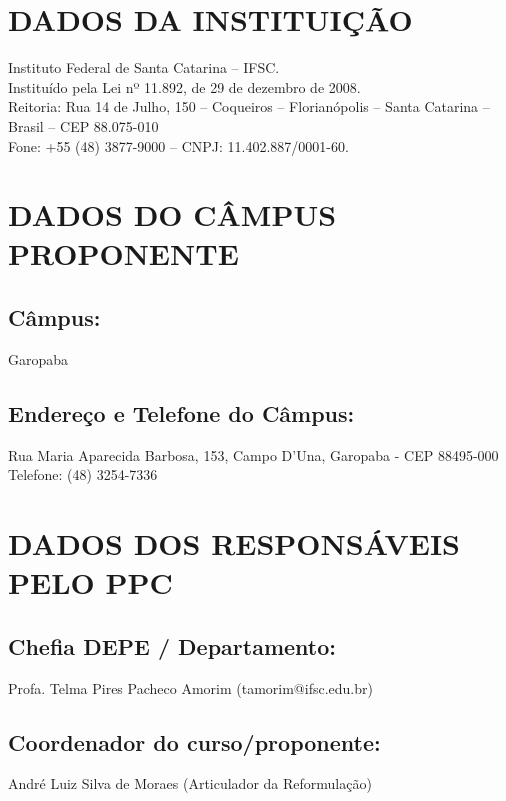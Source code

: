 \documentclass{ifsc-ppc}
\begin{document}

\tableofcontents
\newpage

\section{DADOS DA INSTITUIÇÃO}
Instituto Federal de Santa Catarina -- IFSC. \\
Instituído pela Lei nº 11.892, de 29 de dezembro de 2008. \\
Reitoria: Rua 14 de Julho, 150 -- Coqueiros -- Florianópolis -- Santa Catarina -- Brasil -- CEP 88.075-010 \\
Fone: +55 (48) 3877-9000 -- CNPJ: 11.402.887/0001-60.

\section{DADOS DO CÂMPUS PROPONENTE}
\subsection{Câmpus:}
Garopaba

\subsection{Endereço e Telefone do Câmpus:}
Rua Maria Aparecida Barbosa, 153, Campo D'Una, Garopaba - CEP 88495-000 \\
Telefone: (48) 3254-7336

\section{DADOS DOS RESPONSÁVEIS PELO PPC}
\subsection{Chefia DEPE / Departamento:}
Profa. Telma Pires Pacheco Amorim (tamorim@ifsc.edu.br)

\subsection{Coordenador do curso/proponente:}
André Luiz Silva de Moraes (Articulador da Reformulação)
\end{document}
